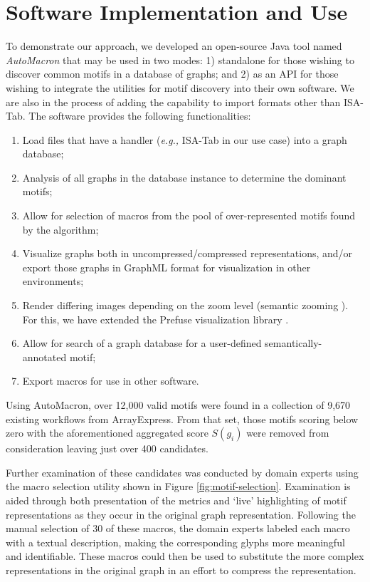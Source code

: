 \section{Software Implementation and Use}

To demonstrate our approach, we developed an open-source Java tool named \emph{AutoMacron} that may be used in two modes: 1) standalone for those wishing to discover common motifs in a database of graphs; and 2) as an API for those wishing to integrate the utilities for motif discovery into their own software. We are also in the process of adding the capability to import formats other than ISA-Tab. 
The software provides the following functionalities:

\vspace{-2mm}
\begin{enumerate}[itemsep=-1mm]
\item Load files that have a handler (\emph{e.g.,} ISA-Tab in our use case) into a graph database;
\item Analysis of all graphs in the database instance to determine the dominant motifs;
\item Allow for selection of macros from the pool of over-represented motifs found by the algorithm;
\item Visualize graphs both in uncompressed/compressed representations, and/or export those graphs in GraphML format for visualization in other environments; 
\item Render differing images depending on the zoom level (semantic zooming \cite{bedersonpad:1994,weaverbuilding2004}). For this, we have extended the Prefuse visualization library \cite{heer05}.
\item Allow for search of a graph database for a user-defined semantically-annotated motif;
\item Export macros for use in other software.
\end{enumerate}

\vspace{-1mm}
Using AutoMacron, over 12,000 valid motifs were found in a collection of 9,670 existing workflows from ArrayExpress. From that set, those motifs scoring below zero with the aforementioned aggregated score $S(g_i)$ were removed from consideration leaving just over 400 candidates. 

Further examination of these candidates was conducted by domain experts using the macro selection utility shown in Figure \ref{fig:motif-selection}.
Examination is aided through both presentation of the metrics and `live' highlighting of motif representations as they occur in the original graph representation.
Following the manual selection of 30 of these macros, the domain experts labeled each macro with a textual description, making the corresponding glyphs more meaningful and identifiable. These macros could then be used to substitute the more complex representations in the original graph in an effort to compress the representation.

